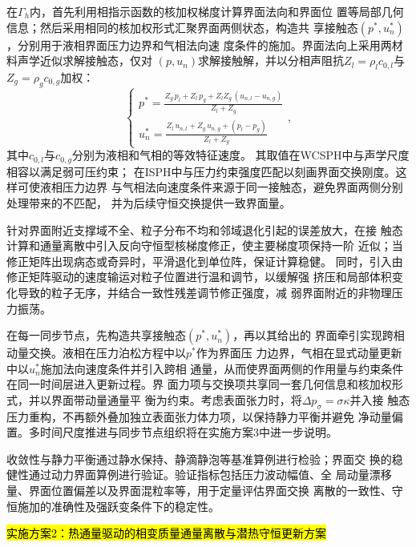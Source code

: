 在$\Gamma_h$内，首先利用相指示函数的核加权梯度计算界面法向和界面位
置等局部几何信息；然后采用相同的核加权形式汇聚界面两侧状态，构造共
享接触态$(p^{\ast},u_n^{\ast})$，分别用于液相界面压力边界和气相法向速
度条件的施加。界面法向上采用两材料声学近似求解接触态，仅对
$(p,u_n)$求解接触解，并以分相声阻抗$Z_l=\rho_l c_{0,l}$与
$Z_g=\rho_g c_{0,g}$加权：
\begin{equation}
	\begin{cases}
		p^{\ast}=\displaystyle\frac{Z_g\,p_l+Z_l\,p_g+Z_l Z_g\,
			(u_{n,l}-u_{n,g})}{Z_l+Z_g}\\[2mm]
		u_n^{\ast}=\displaystyle\frac{Z_l\,u_{n,l}+Z_g\,
			u_{n,g}+(p_l-p_g)}{Z_l+Z_g}
	\end{cases},
\end{equation}
其中$c_{0,l}$与$c_{0,g}$分别为液相和气相的等效特征速度。
其取值在WCSPH中与声学尺度相容以满足弱可压约束；
在ISPH中与压力约束强度匹配以刻画界面交换刚度。这样可使液相压力边界
与气相法向速度条件来源于同一接触态，避免界面两侧分别处理带来的不匹配，
并为后续守恒交换提供一致界面量。

针对界面附近支撑域不全、粒子分布不均和邻域退化引起的误差放大，在接
触态计算和通量离散中引入反向守恒型核梯度修正，使主要梯度项保持一阶
近似；当修正矩阵出现病态或奇异时，平滑退化到单位阵，保证计算稳健。
同时，引入由修正矩阵驱动的速度输运对粒子位置进行温和调节，以缓解强
挤压和局部体积变化导致的粒子无序，并结合一致性残差调节修正强度，减
弱界面附近的非物理压力振荡。

在每一同步节点，先构造共享接触态$(p^{\ast},u_n^{\ast})$，再以其给出的
界面牵引实现跨相动量交换。液相在压力泊松方程中以$p^{\ast}$作为界面压
力边界，气相在显式动量更新中以$u_n^{\ast}$施加法向速度条件并引入跨相
通量，从而使界面两侧的作用量与约束条件在同一时间层进入更新过程。界
面力项与交换项共享同一套几何信息和核加权形式，并以界面带动量通量平
衡为约束。考虑表面张力时，将$\Delta p_{\sigma}=\sigma\kappa$并入接
触态压力重构，不再额外叠加独立表面张力体力项，以保持静力平衡并避免
净动量偏置。多时间尺度推进与同步节点组织将在实施方案3中进一步说明。

收敛性与静力平衡通过静水保持、静滴静泡等基准算例进行检验；界面交
换的稳健性通过动力界面算例进行验证。验证指标包括压力波动幅值、全
局动量漂移量、界面位置偏差以及界面混粒率等，用于定量评估界面交换
离散的一致性、守恒施加的准确性及强跃变条件下的稳定性。

\hl{\zhhei 实施方案2：热通量驱动的相变质量通量离散与潜热守恒更新方案}

